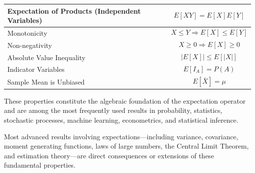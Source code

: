 \documentclass[11pt]{article}
\begin{document}
\begin{mdframed}[
		linewidth=0.8pt,
		roundcorner=6pt,
		backgroundcolor=gray!5,
		linecolor=gray!60,
		innertopmargin=10pt,
		innerbottommargin=10pt,
		innerleftmargin=10pt,
		innerrightmargin=10pt
		]
\begin{center}
\begin{tabular}{|p{5.2cm}|p{7.8cm}|}
				Expectation of Products
				(Independent Variables)
				&
				\[
				E[XY]
				=
				E[X]E[Y]
				\]
				\\
				\hline
				
				Monotonicity
				&
				\[
				X\le Y
				\Longrightarrow
				E[X]\le E[Y]
				\]
				\\
				\hline
				
				Non-negativity
				&
				\[
				X\ge0
				\Longrightarrow
				E[X]\ge0
				\]
				\\
				\hline
				
				Absolute Value Inequality
				&
				\[
				|E[X]|
				\le
				E[|X|]
				\]
				\\
				\hline
				
				Indicator Variables
				&
				\[
				E[I_A]
				=
				P(A)
				\]
				\\
				\hline
				
				Sample Mean is Unbiased
				&
				\[
				E[\bar X]
				=
				\mu
				\]
				\\
				\hline
				
			\end{tabular}
		\end{center}
		
		\bigskip
		
		These properties constitute the algebraic foundation of the expectation
		operator and are among the most frequently used results in probability,
		statistics, stochastic processes, machine learning, econometrics, and
		statistical inference.
		
		Most advanced results involving expectations—including variance,
		covariance, moment generating functions, laws of large numbers, the Central
		Limit Theorem, and estimation theory—are direct consequences or extensions
		of these fundamental properties.
		
	\end{mdframed}
	
	
\end{document}
